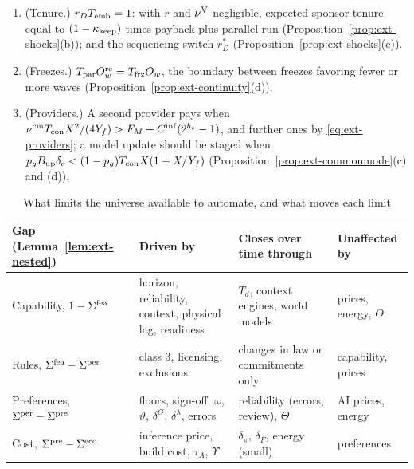 \begin{proposition}
\begin{enumerate}
\item[(g)] (Tenure.) $r_DT_{\rm emb}=1$: with $r$ and $\nu^{\rm V}$ negligible, expected sponsor tenure equal to $(1-\kappa_{\rm keep})$ times payback plus parallel run (Proposition~\ref{prop:ext-shocks}(b)); and the sequencing switch $r_D^*$ (Proposition~\ref{prop:ext-shocks}(c)).
\item[(h)] (Freezes.) $T_{\rm par}O^{\rm re}_w=T_{\rm frz}O_w$, the boundary between freezes favoring fewer or more waves (Proposition~\ref{prop:ext-continuity}(d)).
\item[(i)] (Providers.) A second provider pays when $\nu^{\rm cm}T_{\rm con}X^2/(4Y_f)>F_M+C^{\rm inf}(2^{b_v}-1)$, and further ones by \eqref{eq:ext-providers}; a model update should be staged when $p_gB_{\rm up}\delta_c<(1-p_g)T_{\rm con}X(1+X/Y_f)$ (Proposition~\ref{prop:ext-commonmode}(c) and (d)).
\end{enumerate}
\end{proposition}

\begin{table}[t]
\centering
\caption{What limits the universe available to automate, and what moves each limit}\label{tab:ext-limits}
\footnotesize
\setlength{\tabcolsep}{4pt}
\begin{tabular}{@{}p{3.2cm}p{4.9cm}p{4.2cm}p{2.5cm}@{}}
\toprule
Gap (Lemma~\ref{lem:ext-nested}) & Driven by & Closes over time through & Unaffected by\\
\midrule
Capability, $1-\Sigma^{\rm fea}$ & horizon, reliability, context, physical lag, readiness & $T_d$, context engines, world models & prices, energy, $\Theta$\\
Rules, $\Sigma^{\rm fea}-\Sigma^{\rm per}$ & class 3, licensing, exclusions & changes in law or commitments only & capability, prices\\
Preferences, $\Sigma^{\rm per}-\Sigma^{\rm pre}$ & floors, sign-off, $\omega$, $\vartheta$, $\delta^G$, $\delta^\lambda$, errors & reliability (errors, review), $\Theta$ & AI prices, energy\\
Cost, $\Sigma^{\rm pre}-\Sigma^{\rm eco}$ & inference price, build cost, $\tau_A$, $\Upsilon$ & $\delta_\pi$, $\delta_F$, energy (small) & preferences\\
\bottomrule
\end{tabular}
\end{table}
